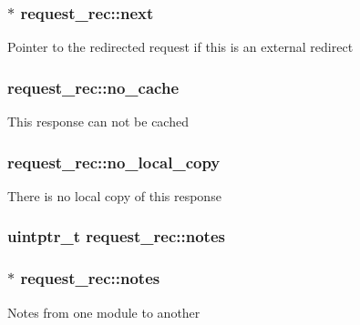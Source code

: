 \subsubsection[{\texorpdfstring{next}{next}}]{$\ast$ request\+\_\+rec\+::next}\hypertarget{structrequest__rec_af8eff4e5ff8cb3df48c6015841e2dd83}{}\label{structrequest__rec_af8eff4e5ff8cb3df48c6015841e2dd83}
Pointer to the redirected request if this is an external redirect 
\subsubsection[{\texorpdfstring{no\+\_\+cache}{no_cache}}]{ request\+\_\+rec\+::no\+\_\+cache}\hypertarget{structrequest__rec_a9ab34a599dccdcf4f8161d0d06371a66}{}\label{structrequest__rec_a9ab34a599dccdcf4f8161d0d06371a66}
This response can not be cached 
\subsubsection[{\texorpdfstring{no\+\_\+local\+\_\+copy}{no_local_copy}}]{ request\+\_\+rec\+::no\+\_\+local\+\_\+copy}\hypertarget{structrequest__rec_aa06f72f40d7318fefcc3a08ffe196c41}{}\label{structrequest__rec_aa06f72f40d7318fefcc3a08ffe196c41}
There is no local copy of this response 
\subsubsection[{\texorpdfstring{notes}{notes}}]{\setlength{\rightskip}{0pt plus 5cm}uintptr\+\_\+t request\+\_\+rec\+::notes}\hypertarget{structrequest__rec_a8be66d4328766cf1da8913c9b51e0e30}{}\label{structrequest__rec_a8be66d4328766cf1da8913c9b51e0e30}
\subsubsection[{\texorpdfstring{notes}{notes}}]{$\ast$ request\+\_\+rec\+::notes}\hypertarget{structrequest__rec_a53bf379e72ab617b95be314af47f0dcb}{}\label{structrequest__rec_a53bf379e72ab617b95be314af47f0dcb}
Notes from one module to another 
